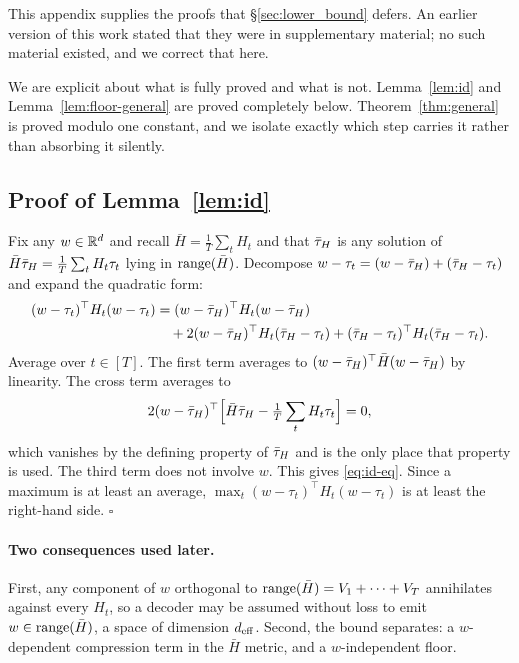 This appendix supplies the proofs that \S\ref{sec:lower_bound} defers. An
earlier version of this work stated that they were in supplementary material;
no such material existed, and we correct that here.

We are explicit about what is fully proved and what is not.
Lemma~\ref{lem:id} and Lemma~\ref{lem:floor-general} are proved completely
below. Theorem~\ref{thm:general} is proved modulo one constant, and we isolate
exactly which step carries it rather than absorbing it silently.

\subsection{Proof of Lemma~\ref{lem:id}}

Fix any $w \in \mathbb{R}^d$ and recall $\bar H = \frac1T\sum_t H_t$ and that $\bar{\tau}_H$
is any solution of $\bar H \bar{\tau}_H = \frac1T\sum_t H_t \tau_t$ lying in
$\operatorname{range}(\bar H)$. Decompose $w - \tau_t = (w - \bar{\tau}_H) + (\bar{\tau}_H - \tau_t)$ and
expand the quadratic form:
\begin{align*}
  (w-\tau_t)^\top H_t (w-\tau_t)
  &= (w-\bar{\tau}_H)^\top H_t (w-\bar{\tau}_H) \\
  &\quad + 2 (w-\bar{\tau}_H)^\top H_t (\bar{\tau}_H - \tau_t)
   + (\bar{\tau}_H-\tau_t)^\top H_t (\bar{\tau}_H-\tau_t).
\end{align*}
Average over $t \in [T]$. The first term averages to
$(w-\bar{\tau}_H)^\top \bar H (w-\bar{\tau}_H)$ by linearity. The cross term averages to
\begin{equation*}
  2 (w-\bar{\tau}_H)^\top\Bigl[\bar H \bar{\tau}_H - \tfrac1T\sum_t H_t \tau_t\Bigr] = 0,
\end{equation*}
which vanishes by the defining property of $\bar{\tau}_H$ and is the only place that
property is used. The third term does not involve $w$. This gives
\eqref{eq:id-eq}. Since a maximum is at least an average,
$\max_t (w-\tau_t)^\top H_t (w-\tau_t)$ is at least the right-hand side.
\hfill$\square$

\paragraph{Two consequences used later.} First, any component of $w$
orthogonal to $\operatorname{range}(\bar H) = V_1 + \cdots + V_T$ annihilates against every
$H_t$, so a decoder may be assumed without loss to emit
$w \in \operatorname{range}(\bar H)$, a space of dimension $d_{\mathrm{eff}}$. Second, the bound
separates: a $w$-dependent compression term in the $\bar H$ metric, and a
$w$-independent floor.

